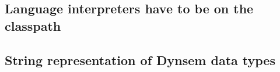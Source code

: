 \subsection{Language interpreters have to be on the classpath}
\label{sec:discuss-classpath}

\subsection{String representation of Dynsem data types}
\label{sec:discuss-dynsem-string}

